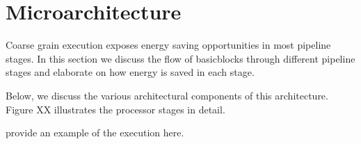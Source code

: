\section{Microarchitecture}
\label{sec:arch}

Coarse grain execution exposes energy saving opportunities in most pipeline
stages. In this section we discuss the flow of basicblocks through different
pipeline stages and elaborate on how energy is saved in each stage.

Below, we discuss the various architectural components of this architecture.
Figure XX illustrates the processor stages in detail.









provide an example of the execution here.



